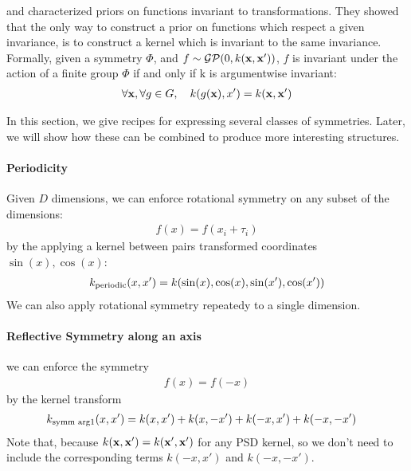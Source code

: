 


\citet{ginsbourger2012argumentwise} and \citet{Invariances13} characterized \gp{} priors on functions invariant to transformations.
They showed that the only way to construct a prior on functions which respect a given invariance, is to construct a kernel which is invariant to the same invariance.
Formally,
given a symmetry $\Phi$, and $f \sim \mathcal{GP}\!\left(0,k({\bf{x}},{\bf{x}}')\right)$, $f$ is invariant under the action of a finite group $\Phi$ if and only if k is argumentwise invariant:
%
\begin{align}
\forall {\bf{x}}, \forall g \in G, \quad k( g({\bf{x}}), x') = k({\bf{x}}, {\bf{x}}')
\end{align}

In this section, we give recipes for expressing several classes of symmetries.  Later, we will show how these can be combined to produce more interesting structures.

\paragraph{Periodicity}
Given $D$ dimensions, we can enforce rotational symmetry on any subset of the dimensions:
%
\begin{align}
f(x) = f( x_i + \tau_i)%
\end{align}
%
by the applying a kernel between pairs transformed coordinates $\sin(x), \cos(x)$:
%
\begin{align}
k_{\textnormal{periodic}}(x, x') = k(\sin(x), \cos(x), \sin(x'), \cos(x'))
\end{align}
%
We can also apply rotational symmetry repeatedy to a single dimension.

\paragraph{Reflective Symmetry along an axis}
we can enforce the symmetry
\begin{align}
f(x) = f( -x)
\end{align}
%
by the kernel transform
%
\begin{align}
k_{\textnormal{symm arg1}}(x, x') & = k(x, x') + k(x, -x') + k(-x, x') + k(-x, -x')
\end{align}
%
Note that, because $k({\bf{x}}, {\bf{x}}') = k({\bf{x}}', {\bf{x}}')$ for any PSD kernel, so we don't need to include the corresponding terms $k(-x, x')$ and $k(-x, -x')$.

